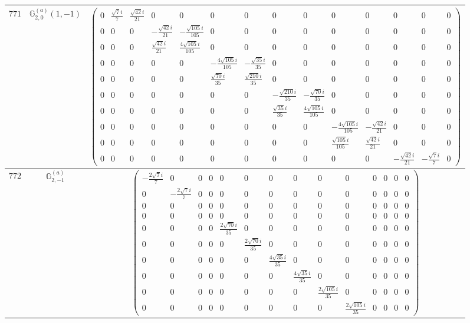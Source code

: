 \documentclass[fleqn,8pt,landscape]{jsarticle}
\begin{document}
\begin{center}
\begin{longtable}{ccc}
$ 771 $ & $ \mathbb{G}_{2,0}^{(a)}(1,-1) $ & $ \begin{pmatrix} 0 & \frac{\sqrt{7} i}{7} & \frac{\sqrt{42} i}{21} & 0 & 0 & 0 & 0 & 0 & 0 & 0 & 0 & 0 & 0 & 0 \\ 0 & 0 & 0 & - \frac{\sqrt{42} i}{21} & - \frac{\sqrt{105} i}{105} & 0 & 0 & 0 & 0 & 0 & 0 & 0 & 0 & 0 \\ 0 & 0 & 0 & \frac{\sqrt{42} i}{21} & \frac{4 \sqrt{105} i}{105} & 0 & 0 & 0 & 0 & 0 & 0 & 0 & 0 & 0 \\ 0 & 0 & 0 & 0 & 0 & - \frac{4 \sqrt{105} i}{105} & - \frac{\sqrt{35} i}{35} & 0 & 0 & 0 & 0 & 0 & 0 & 0 \\ 0 & 0 & 0 & 0 & 0 & \frac{\sqrt{70} i}{35} & \frac{\sqrt{210} i}{35} & 0 & 0 & 0 & 0 & 0 & 0 & 0 \\ 0 & 0 & 0 & 0 & 0 & 0 & 0 & - \frac{\sqrt{210} i}{35} & - \frac{\sqrt{70} i}{35} & 0 & 0 & 0 & 0 & 0 \\ 0 & 0 & 0 & 0 & 0 & 0 & 0 & \frac{\sqrt{35} i}{35} & \frac{4 \sqrt{105} i}{105} & 0 & 0 & 0 & 0 & 0 \\ 0 & 0 & 0 & 0 & 0 & 0 & 0 & 0 & 0 & - \frac{4 \sqrt{105} i}{105} & - \frac{\sqrt{42} i}{21} & 0 & 0 & 0 \\ 0 & 0 & 0 & 0 & 0 & 0 & 0 & 0 & 0 & \frac{\sqrt{105} i}{105} & \frac{\sqrt{42} i}{21} & 0 & 0 & 0 \\ 0 & 0 & 0 & 0 & 0 & 0 & 0 & 0 & 0 & 0 & 0 & - \frac{\sqrt{42} i}{21} & - \frac{\sqrt{7} i}{7} & 0 \end{pmatrix} $ \\ \hline
$ 772 $ & $ \mathbb{G}_{2,-1}^{(a)} $ & $ \begin{pmatrix} - \frac{2 \sqrt{7} i}{7} & 0 & 0 & 0 & 0 & 0 & 0 & 0 & 0 & 0 & 0 & 0 & 0 & 0 \\ 0 & - \frac{2 \sqrt{7} i}{7} & 0 & 0 & 0 & 0 & 0 & 0 & 0 & 0 & 0 & 0 & 0 & 0 \\ 0 & 0 & 0 & 0 & 0 & 0 & 0 & 0 & 0 & 0 & 0 & 0 & 0 & 0 \\ 0 & 0 & 0 & 0 & 0 & 0 & 0 & 0 & 0 & 0 & 0 & 0 & 0 & 0 \\ 0 & 0 & 0 & 0 & \frac{2 \sqrt{70} i}{35} & 0 & 0 & 0 & 0 & 0 & 0 & 0 & 0 & 0 \\ 0 & 0 & 0 & 0 & 0 & \frac{2 \sqrt{70} i}{35} & 0 & 0 & 0 & 0 & 0 & 0 & 0 & 0 \\ 0 & 0 & 0 & 0 & 0 & 0 & \frac{4 \sqrt{35} i}{35} & 0 & 0 & 0 & 0 & 0 & 0 & 0 \\ 0 & 0 & 0 & 0 & 0 & 0 & 0 & \frac{4 \sqrt{35} i}{35} & 0 & 0 & 0 & 0 & 0 & 0 \\ 0 & 0 & 0 & 0 & 0 & 0 & 0 & 0 & \frac{2 \sqrt{105} i}{35} & 0 & 0 & 0 & 0 & 0 \\ 0 & 0 & 0 & 0 & 0 & 0 & 0 & 0 & 0 & \frac{2 \sqrt{105} i}{35} & 0 & 0 & 0 & 0 \end{pmatrix} $ \\ \hline

\end{longtable}
\end{center}
\end{document}
